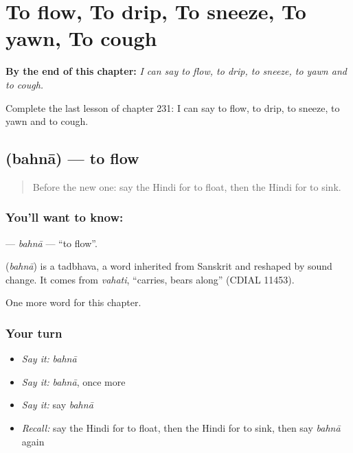 
\chapter{To flow, To drip, To sneeze, To yawn, To cough}
\label{ch:hi-to-flow-to-drip-to-sneeze-to-yawn-to-cough}

\begin{chapteropening}
\textbf{By the end of this chapter:} \emph{I can say to flow, to drip, to sneeze, to yawn and to cough.}

Complete the last lesson of chapter 231: I can say to flow, to drip, to sneeze, to yawn and to cough.
\end{chapteropening}

\section[\texorpdfstring{\hi{बहना} (bahnā)}{बहना (bahnā)}]{ (bahnā) — to flow}

\label{lesson:HI-C231-bahna}



\begin{quote}
Before the new one: say the Hindi for to float, then the Hindi for to sink.
\end{quote}

\subsection*{You'll want to know: }
\textbf{} — \emph{bahnā} — \textquotedblleft{}to flow\textquotedblright{}.

\begin{cousinweb}
\textbf{} (\emph{bahnā}) is a tadbhava, a word inherited from Sanskrit and reshaped by sound change. It comes from \emph{vahati}, \textquotedblleft{}carries, bears along\textquotedblright{} (CDIAL 11453).
\end{cousinweb}

\begin{grammarlens}[title={What you've built}]
One more word for this chapter.
\end{grammarlens}

\subsection*{Your turn}
\begin{itemize}
\raggedright
  \item \emph{Say it:} \emph{bahnā}
  \item \emph{Say it:} \emph{bahnā}, once more
  \item \emph{Say it:} say \emph{bahnā}
  \item \emph{Recall:} say the Hindi for to float, then the Hindi for to sink, then say \emph{bahnā} again
\end{itemize}

